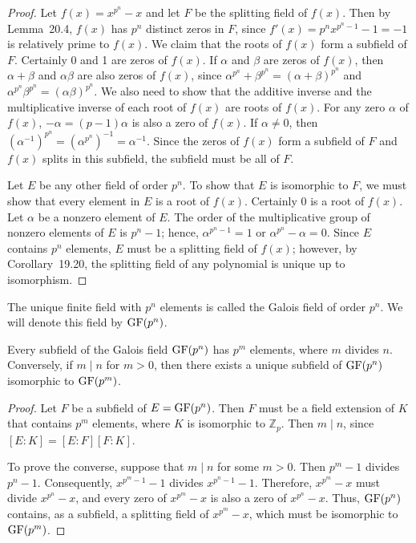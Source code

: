 \begin{proof}
Let $f(x) = x^{p^n} - x$ and let $F$ be the splitting field of $f(x)$.  Then by Lemma~20.4, $f(x)$ has $p^n$ distinct zeros in $F$, since $f'(x) = p^n x^{p^n - 1} - 1 = -1$ is relatively prime to $f(x)$.  We claim that the roots of $f(x)$ form a subfield of $F$.  Certainly 0 and 1 are zeros of $f(x)$.  If $\alpha$ and $\beta$ are zeros of $f(x)$, then $\alpha + \beta$ and $\alpha \beta$ are also zeros of $f(x)$, since $\alpha^{p^n} + \beta^{p^n} =  (\alpha + \beta)^{p^n}$ and $\alpha^{p^n} \beta^{p^n} = (\alpha \beta)^{p^n}$. We also need to show that the additive inverse and the multiplicative inverse of each root of $f(x)$ are roots of $f(x)$.  For any zero $\alpha$ of $f(x)$, $-\alpha = (p - 1)\alpha$ is also a zero of $f(x)$. If $\alpha \neq 0$, then $(\alpha^{-1})^{p^n} = (\alpha^{p^n})^{-1} = \alpha^{-1}$. Since the zeros of $f(x)$ form a subfield of $F$ and $f(x)$ splits in this subfield, the subfield must be all of $F$. 

Let $E$ be any other field of order $p^n$.  To show that $E$ is isomorphic to $F$, we must show that every element in $E$ is a root of $f(x)$.  Certainly 0 is a root of $f(x)$.  Let $\alpha$ be a nonzero element of $E$.  The order of the multiplicative group of nonzero elements of $E$ is $p^n-1$; hence, $\alpha^{p^n-1} =1$ or $\alpha^{p^n} -\alpha = 0$.  Since $E$ contains $p^n$ elements, $E$ must be a splitting field of $f(x)$; however, by Corollary~19.20, the splitting field of any polynomial is unique up to isomorphism. 
\end{proof}
 
\medskip

The unique finite field with $p^n$ elements is called the {\bfi Galois field\/} of order $p^n$. We will denote this field by ${\rm GF}(p^n)$\label{galoisfield}. 

\begin{theorem}
Every subfield of the Galois field ${\rm GF}(p^n)$ has $p^m$ elements, where $m$ divides $n$.  Conversely, if $m \mid n$ for $m > 0$, then  there exists a unique subfield of ${\rm GF}(p^n)$ isomorphic to  ${\rm GF}(p^m)$.
\end{theorem}

\begin{proof}
Let $F$ be a subfield of $E = {\rm GF}(p^n)$.  Then $F$ must be a field extension of $K$ that contains  $p^m$ elements, where $K$ is isomorphic to ${\mathbb Z}_p$.   Then $m \mid n$, since $[E:K] = [E:F][F:K]$.

To prove the converse, suppose that $m \mid n$ for some $m > 0$.  Then $p^m -1$ divides $p^n -1$. Consequently, $x^{p^m -1} - 1$ divides $x^{p^n -1} -1$. Therefore, $x^{p^m} - x$ must divide $x^{p^n} - x$, and every zero of $x^{p^m} - x$ is also a zero of $x^{p^n} - x$. Thus, ${\rm GF}(p^n)$ contains, as a subfield, a splitting field of $x^{p^m} - x$, which must be isomorphic to ${\rm GF}(p^m)$.
\end{proof}
     
